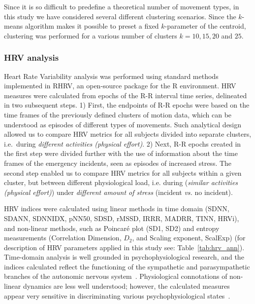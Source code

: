 \documentclass[smallcondensed]{svjour3}
\begin{document}

Since it is so difficult to predefine a theoretical number of movement types, in this study we have considered several different clustering scenarios. Since the $k$-means algorithm makes it possible to preset a fixed $k$-parameter of the centroid, clustering was performed for a various number of clusters $k = 10, 15, 20$ and $25$.

\subsubsection{HRV analysis}

Heart Rate Variability analysis was performed using standard methods implemented in RHRV, an open-source package for the R environment. HRV measures were calculated from epochs of the R-R interval time series, delineated in two subsequent steps. 1) First, the endpoints of R-R epochs were based on the time frames of the previously defined clusters of motion data, which can be understood as episodes of different types of movements. Such analytical design allowed us to compare HRV metrics for all subjects divided into separate clusters, i.e.\ during \textit{different activities (physical effort)}. 2) Next, R-R epochs created in the first step were divided further with the use of information about the time frames of the emergency incidents, seen as episodes of increased stress. The second step enabled us to compare HRV metrics for all subjects within a given cluster, but between different physiological load, i.e. during  (\textit{similar activities (physical effort)}) under \textit{different amount of stress} (incident \textit{vs.} no incident).


HRV indices were calculated using linear methods in time domain (SDNN, SDANN, SDNNIDX, pNN50, SDSD, rMSSD, IRRR, MADRR, TINN, HRVi), and non-linear methods, such as Poincar\'e plot (SD1, SD2) and entropy measurements (Correlation Dimension, $D_2$, and Scaling exponent, ScalExp) (for description of HRV parameters applied in this study see: Table~\ref{tab:hrv_ann}). Time-domain analysis is well grounded in psychophysiological research, and the indices calculated reflect the functioning of the sympathetic and parasympathetic branches of the autonomic nervous system~\cite{berntson1997heart}. Physiological connotations of non-linear dynamics are less well understood; however, the calculated measures appear very sensitive in discriminating various psychophysiological states~\cite{sassi2015advances,young2015we}.
\end{document}
